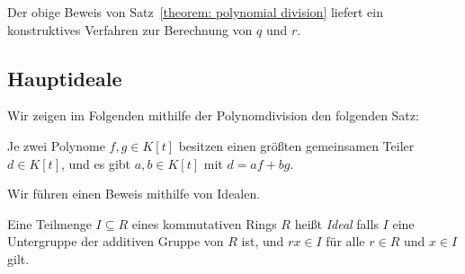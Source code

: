 \begin{remark}
  Der obige Beweis von Satz~\ref{theorem: polynomial division} liefert ein konstruktives Verfahren zur Berechnung von $q$ und $r$.
\end{remark}





\subsection{Hauptideale}

Wir zeigen im Folgenden mithilfe der Polynomdivision den folgenden Satz:

\begin{theorem}
  \label{theorem: existence of greatest common divisors}
  Je zwei Polynome $f, g \in K[t]$ besitzen einen größten gemeinsamen Teiler $d \in K[t]$, und es gibt $a, b \in K[t]$ mit $d = af + bg$.
\end{theorem}

Wir führen einen Beweis mithilfe von Idealen.

\begin{definition}
  Eine Teilmenge $I \subseteq R$ eines kommutativen Rings $R$ heißt \emph{Ideal} falls $I$ eine Untergruppe der additiven Gruppe von $R$ ist, und $rx \in I$ für alle $r \in R$ und $x \in I$ gilt.
\end{definition}

